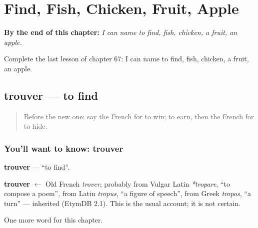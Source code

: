 
\chapter{Find, Fish, Chicken, Fruit, Apple}
\label{ch:fr-find-fish-chicken-fruit-apple}

\begin{chapteropening}
\textbf{By the end of this chapter:} \emph{I can name to find, fish, chicken, a fruit, an apple.}

Complete the last lesson of chapter 67: I can name to find, fish, chicken, a fruit, an apple.
\end{chapteropening}

\section[trouver]{trouver — to find}

\label{lesson:FR-C67-trouver}



\begin{quote}
Before the new one: say the French for to win; to earn, then the French for to hide.
\end{quote}

\subsection*{You'll want to know: trouver}
\textbf{trouver} — \textquotedblleft{}to find\textquotedblright{}.

\begin{cousinweb}
\textbf{trouver} $\leftarrow$ Old French \emph{trover}, probably from Vulgar Latin \emph{*tropare}, \textquotedblleft{}to compose a poem\textquotedblright{}, from Latin \emph{tropus}, \textquotedblleft{}a figure of speech\textquotedblright{}, from Greek \emph{tropos}, \textquotedblleft{}a turn\textquotedblright{} — inherited (EtymDB 2.1). This is the usual account; it is not certain.
\end{cousinweb}

\begin{grammarlens}[title={What you've built}]
One more word for this chapter.
\end{grammarlens}

